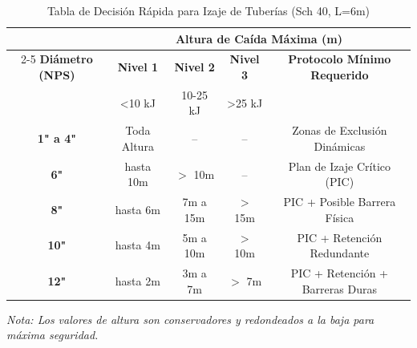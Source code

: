 \documentclass[11pt, a4paper, spanish]{article}
\begin{document}
\begin{table}[H]
    \centering
    \caption*{Tabla de Decisión Rápida para Izaje de Tuberías (Sch 40, L=6m)}
    \renewcommand{\arraystretch}{1.4}
    \begin{tabular}{c c c c c}
        \toprule
        \rowcolor{WCGray}
        & \multicolumn{4}{c}{\textbf{\color{white}Altura de Caída Máxima (m)}} \\
        \cmidrule(lr){2-5}
        \rowcolor{WCGray}
        \textbf{\color{white}Diámetro (NPS)} & \textbf{\color{white}Nivel 1} & \textbf{\color{white}Nivel 2} & \textbf{\color{white}Nivel 3} & \textbf{\color{white}Protocolo Mínimo Requerido} \\
        \rowcolor{WCGray}
        & \small{\color{white}<10 kJ} & \small{\color{white}10-25 kJ} & \small{\color{white}>25 kJ} & \\
        \midrule
        \rowcolor{WCLightGray}
        \textbf{1" a 4"}   & Toda Altura & --           & --            & Zonas de Exclusión Dinámicas \\
        \textbf{6"}         & hasta 10m   & $>$ 10m      & --            & Plan de Izaje Crítico (PIC) \\
        \rowcolor{WCLightGray}
        \textbf{8"}         & hasta 6m    & 7m a 15m     & $>$ 15m       & PIC + Posible Barrera Física \\
        \textbf{10"}        & hasta 4m    & 5m a 10m     & $>$ 10m       & PIC + Retención Redundante \\
        \rowcolor{WCLightGray}
        \textbf{12"}        & hasta 2m    & 3m a 7m      & $>$ 7m        & PIC + Retención + Barreras Duras \\
        \bottomrule
    \end{tabular}
    \vspace{0.2cm}
    \small\textit{Nota: Los valores de altura son conservadores y redondeados a la baja para máxima seguridad.}
\end{table}
\end{document}
